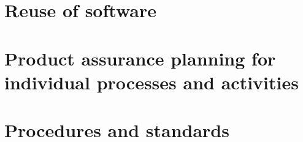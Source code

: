 \section{	Reuse of software}
\section{	Product assurance planning for individual processes and activities}
\section{Procedures and standards}


\clearpage
